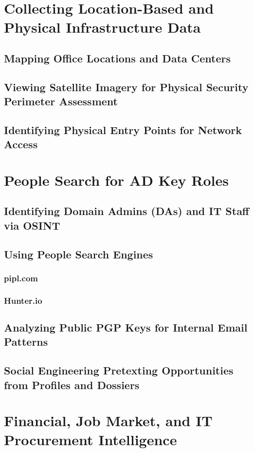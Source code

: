 \documentclass{article}
\begin{document}
\section{Collecting Location-Based and Physical Infrastructure Data}
\subsection{Mapping Office Locations and Data Centers}
\subsection{Viewing Satellite Imagery for Physical Security Perimeter Assessment}
\subsection{Identifying Physical Entry Points for Network Access}
\section{People Search for AD Key Roles}
\subsection{Identifying Domain Admins (DAs) and IT Staff via OSINT}
\subsection{Using People Search Engines}
\subsubsection{pipl.com}
\subsubsection{Hunter.io}
\subsection{Analyzing Public PGP Keys for Internal Email Patterns}
\subsection{Social Engineering Pretexting Opportunities from Profiles and Dossiers}
\section{Financial, Job Market, and IT Procurement Intelligence}
\end{document}
